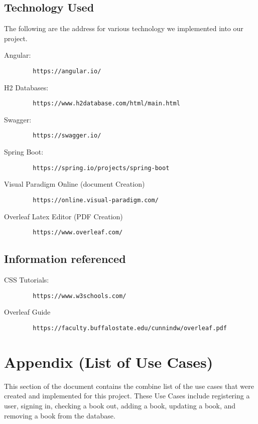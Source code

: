 \documentclass{article}
\begin{document}
	
	\subsection{Technology Used}
	
	The following are the address for various technology we implemented into our project.
	
	Angular:
	\begin{verbatim}
		https://angular.io/
	\end{verbatim}

	H2 Databases:
	\begin{verbatim}
		https://www.h2database.com/html/main.html
	\end{verbatim}

	Swagger:
	\begin{verbatim}
		https://swagger.io/
	\end{verbatim}

	Spring Boot:
	\begin{verbatim}
		https://spring.io/projects/spring-boot
	\end{verbatim}

	Visual Paradigm Online (document Creation)
	\begin{verbatim}
		https://online.visual-paradigm.com/
	\end{verbatim}

	Overleaf Latex Editor (PDF Creation)
	\begin{verbatim}
		https://www.overleaf.com/
	\end{verbatim}	

	\subsection{Information referenced}
	
	CSS Tutorials:
	\begin{verbatim}
		https://www.w3schools.com/
	\end{verbatim}

	Overleaf Guide
	\begin{verbatim}
		https://faculty.buffalostate.edu/cunnindw/overleaf.pdf
	\end{verbatim}
	

	
	
	\section{Appendix (List of Use Cases)}
	
	This section of the document contains the combine list of the use cases that were created and implemented for this project. These Use Cases include registering a user, signing in, checking a book out, adding a book, updating a book, and removing a book from the database. 
	
\end{document}
